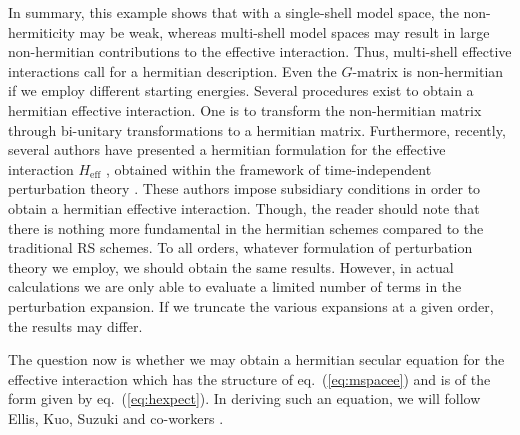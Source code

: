 In summary, this example shows that with a single-shell model space, the
non-hermiticity may be weak, whereas multi-shell model spaces may result in
large non-hermitian contributions to the effective interaction. Thus,
multi-shell effective interactions call for a hermitian description.
Even the $G$-matrix is non-hermitian if we employ
different starting energies.
Several procedures exist to obtain a hermitian effective interaction. One
is to transform the non-hermitian matrix through bi-unitary
transformations to a hermitian matrix. Furthermore,
recently, several authors have presented a hermitian formulation for the
effective interaction $H_{\mathrm{eff}}$ \cite{lindgren91,suzuki93,kuo93},
obtained within the framework of time-independent perturbation theory
\cite{eo77,lm85,bran67}.
These authors impose subsidiary conditions
in order to obtain a hermitian effective interaction.
Though, the reader should note that there is nothing more fundamental
in the hermitian schemes compared to the traditional RS schemes. To all
orders, whatever formulation of perturbation theory we employ, we
should obtain the same results.
However, in actual calculations we are only able to evaluate
a limited number of terms in the perturbation expansion. If we truncate
the various expansions at a given order, the results may differ.


The question now is
whether we may obtain a hermitian secular equation for the effective interaction
which has the structure of eq.\ (\ref{eq:mspacee})
and is of the form given by eq.\ (\ref{eq:hexpect}).
In deriving such an equation, we will follow Ellis, Kuo, Suzuki and co-workers
\cite{suzuki93,kuo93}.


